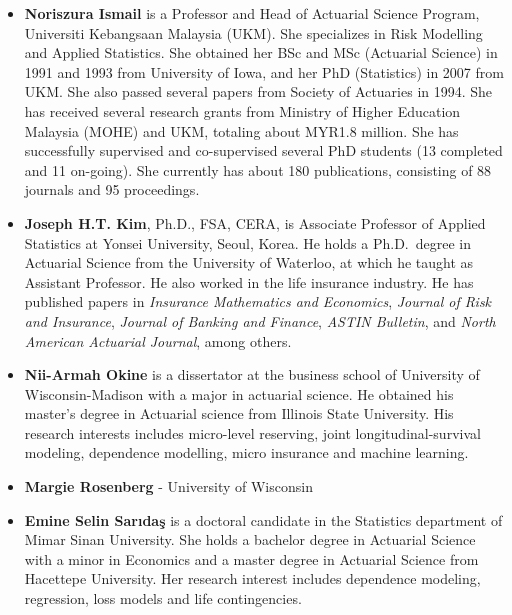 \documentclass[]{book}
\providecommand{\tightlist}{%
  \setlength{\itemsep}{0pt}\setlength{\parskip}{0pt}}
\begin{document}
\begin{itemize}
\tightlist
\item
  \textbf{Noriszura Ismail} is a Professor and Head of Actuarial Science
  Program, Universiti Kebangsaan Malaysia (UKM). She specializes in Risk
  Modelling and Applied Statistics. She obtained her BSc and MSc
  (Actuarial Science) in 1991 and 1993 from University of Iowa, and her
  PhD (Statistics) in 2007 from UKM. She also passed several papers from
  Society of Actuaries in 1994. She has received several research grants
  from Ministry of Higher Education Malaysia (MOHE) and UKM, totaling
  about MYR1.8 million. She has successfully supervised and
  co-supervised several PhD students (13 completed and 11 on-going). She
  currently has about 180 publications, consisting of 88 journals and 95
  proceedings.
\end{itemize}

\begin{itemize}
\tightlist
\item
  \textbf{Joseph H.T. Kim}, Ph.D., FSA, CERA, is Associate Professor of
  Applied Statistics at Yonsei University, Seoul, Korea. He holds a
  Ph.D.~degree in Actuarial Science from the University of Waterloo, at
  which he taught as Assistant Professor. He also worked in the life
  insurance industry. He has published papers in \emph{Insurance
  Mathematics and Economics}, \emph{Journal of Risk and Insurance},
  \emph{Journal of Banking and Finance}, \emph{ASTIN Bulletin}, and
  \emph{North American Actuarial Journal}, among others.
\end{itemize}

\begin{itemize}
\item
  \textbf{Nii-Armah Okine} is a dissertator at the business school of
  University of Wisconsin-Madison with a major in actuarial science. He
  obtained his master's degree in Actuarial science from Illinois State
  University. His research interests includes micro-level reserving,
  joint longitudinal-survival modeling, dependence modelling, micro
  insurance and machine learning.
\item
  \textbf{Margie Rosenberg} - University of Wisconsin
\end{itemize}

\begin{itemize}
\tightlist
\item
  \textbf{Emine Selin Sarıdaş} is a doctoral candidate in the Statistics
  department of Mimar Sinan University. She holds a bachelor degree in
  Actuarial Science with a minor in Economics and a master degree in
  Actuarial Science from Hacettepe University. Her research interest
  includes dependence modeling, regression, loss models and life
  contingencies.
\end{itemize}
\end{document}
